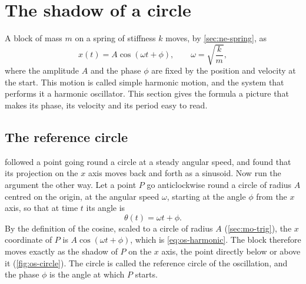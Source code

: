 \section{The shadow of a circle}
\label{sec:os-circle}

A block of mass $m$ on a spring of stiffness $k$ moves, by
\cref{sec:ne-spring}, as
\begin{equation}
   x(t) = A\cos(\omega t + \phi) , \qquad \omega = \sqrt{\frac{k}{m}} ,
   \label{eq:os-harmonic}
\end{equation}
where the amplitude $A$ and the phase $\phi$ are fixed by the position
and velocity at the start. This motion is called simple harmonic motion,
and the system that performs it a harmonic oscillator. This section
gives the formula a picture that makes its phase, its velocity and its
period easy to read.

\subsection*{The reference circle}

 followed a point going round a circle at a steady
angular speed, and found that its projection on the $x$ axis moves back
and forth as a sinusoid. Now run the argument the other way. Let a point $P$ go anticlockwise
round a circle of radius $A$ centred on the origin, at the angular speed
$\omega$, starting at the angle $\phi$ from the $x$ axis, so that at time
$t$ its angle is
\begin{equation*}
   \theta(t) = \omega t + \phi .
\end{equation*}
By the definition of the cosine, scaled to a circle of radius $A$
(\cref{sec:mo-trig}), the $x$ coordinate of $P$ is $A\cos(\omega t +
\phi)$, which is \cref{eq:os-harmonic}. The block therefore moves exactly
as the shadow of $P$ on the $x$ axis, the point directly below or above
it (\cref{fig:os-circle}). The circle is called the reference circle of
the oscillation, and the phase $\phi$ is the angle at which $P$
starts.


